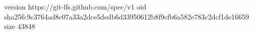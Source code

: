 version https://git-lfs.github.com/spec/v1
oid sha256:9c3764ad8c07a33a2dce5dedb6d33950612b8f9cfb6a582e783c2dcf1de16659
size 43848
